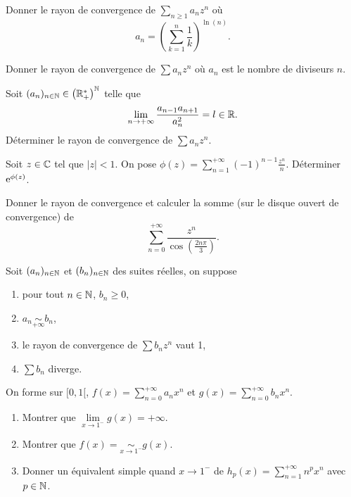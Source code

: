 \documentclass[12pt]{article}
\begin{document}
\begin{exercise}
    Donner le rayon de convergence de $\sum_{n\geqslant1}a_{n}z^{n}$ où 
    \begin{equation}
        a_n=\left(\sum_{k=1}^{n}\frac{1}{k}\right)^{\ln(n)}.
    \end{equation}
\end{exercise}

\begin{exercise}
    Donner le rayon de convergence de $\sum a_{n}z^{n}$ où $a_n$ est le nombre de diviseurs $n$.
\end{exercise}

\begin{exercise}
    Soit $(a_n)_{n\in\mathbb{N}}\in\left(\mathbb{R}_{+}^{*}\right)^{\mathbb{N}}$ telle que 
    \begin{equation}
        \lim\limits_{n\to+\infty}\frac{a_{n-1}a_{n+1}}{a_{n}^{2}}=l\in\mathbb{R}.
    \end{equation}
    Déterminer le rayon de convergence de $\sum a_{n}z^{n}$.
\end{exercise}

\begin{exercise}
    Soit $z\in\mathbb{C}$ tel que $\left\lvert z\right\rvert<1$. On pose $\phi(z)=\sum_{n=1}^{+\infty}(-1)^{n-1}\frac{z^{n}}{n}$. Déterminer $\mathrm{e}^{\phi(z)}$.
\end{exercise}

\begin{exercise}
    Donner le rayon de convergence et calculer la somme (sur le disque ouvert de convergence) de 
    \begin{equation}
        \sum_{n=0}^{+\infty}\frac{z^{n}}{\cos\left(\frac{2n\pi}{3}\right)}.
    \end{equation}
\end{exercise}

\begin{exercise}
    Soit $(a_n)_{n\in\mathbb{N}}$ et $(b_n)_{n\in\mathbb{N}}$ des suites réelles, on suppose
    \begin{enumerate}[label=\roman*)]
        \item pour tout $n\in\mathbb{N}$, $b_n\geqslant0$,
        \item $a_n\underset{+\infty}{\sim}b_n$,
        \item le rayon de convergence de $\sum b_{n}z^{n}$ vaut 1,
        \item $\sum b_{n}$ diverge.
    \end{enumerate}

    On forme sur $[0,1[$, $f(x)=\sum_{n=0}^{+\infty}a_{n}x^{n}$ et $g(x)=\sum_{n=0}^{+\infty}b_{n}x^{n}$.

    \begin{enumerate}
        \item Montrer que $\lim\limits_{x\to1^{-}}g(x)=+\infty$.
        \item Montrer que $f(x)=\underset{x\to1^{-}}{\sim}g(x)$.
        \item Donner un équivalent simple quand $x\to1^{-}$ de $h_p(x)=\sum_{n=1}^{+\infty}n^{p}x^{n}$ avec $p\in\mathbb{N}$.
    \end{enumerate}
\end{exercise}
\end{document}
